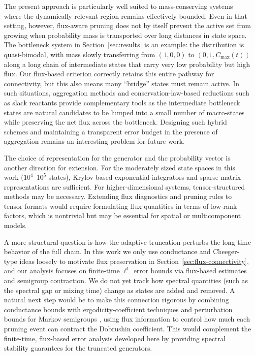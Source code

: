 \documentclass[onefignum,onetabnum]{siamart171218}
\begin{document}
The present approach is particularly well suited to mass-conserving systems where the dynamically relevant region remains effectively bounded. Even in that setting, however, flux-aware pruning does not by itself prevent the active set from growing when probability mass is transported over long distances in state space. The bottleneck system in Section~\ref{sec:results} is an example: the distribution is quasi-bimodal, with mass slowly transferring from $(1,0,0)$ to $(0,1,C_{\max}(t))$ along a long chain of intermediate states that carry very low probability but high flux. Our flux-based criterion correctly retains this entire pathway for connectivity, but this also means many “bridge” states must remain active. In such situations, aggregation methods \cite{aggregation,peles,zhang_cao} and conservation-law-based reductions such as slack reactants \cite{slack} provide complementary tools as the intermediate bottleneck states are natural candidates to be lumped into a small number of macro-states while preserving the net flux across the bottleneck. Designing such hybrid schemes and maintaining a transparent error budget in the presence of aggregation remains an interesting problem for future work.


The choice of representation for the generator and the probability vector is another direction for extension. For the moderately sized state spaces in this work ($10^4$–$10^5$ states), Krylov-based exponential integrators \cite{Sidje1998} and sparse matrix representations are sufficient. For higher-dimensional systems, tensor-structured methods \cite{Kazeev2014,Dinh_2020} may be necessary. Extending flux diagnostics and pruning rules to tensor formats would require formulating flux quantities in terms of low-rank factors, which is nontrivial but may be essential for spatial or multicomponent models.

A more structural question is how the adaptive truncation perturbs the long-time behavior of the full chain. In this work we only use conductance and Cheeger-type ideas loosely to motivate flux preservation in Section~\ref{sec:flux-connectivity}, and our analysis focuses on finite-time $\ell^1$ error bounds via flux-based estimates and semigroup contraction. We do not yet track how spectral quantities (such as the spectral gap or mixing time) change as states are added and removed. A natural next step would be to make this connection rigorous by combining conductance bounds with ergodicity-coefficient techniques \cite{Rhodius2000Ergodicity, RHODIUS1997141} and perturbation bounds for Markov semigroups \cite{pazy_1983}, using flux information to control how much each pruning event can contract the Dobrushin coefficient. This would complement the finite-time, flux-based error analysis developed here by providing spectral stability guarantees for the truncated generators.
\end{document}
